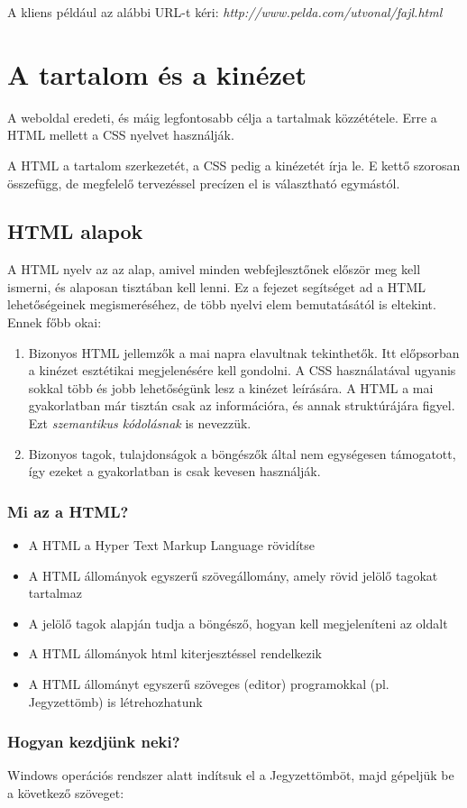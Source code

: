 \documentclass[12pt,twoside]{report}
\theoremstyle{definition}
\begin{document}
A kliens például az alábbi URL-t kéri: \emph{http://www.pelda.com/utvonal/fajl.html}
\chapter{A tartalom és a kinézet}
A weboldal eredeti, és máig legfontosabb célja a tartalmak közzététele. Erre a HTML mellett a CSS nyelvet használják.

A HTML a tartalom szerkezetét, a CSS pedig a kinézetét írja le. E kettő szorosan összefügg, de megfelelő tervezéssel precízen el is választható egymástól.
\section{HTML alapok}
A HTML nyelv az az alap, amivel minden webfejlesztőnek először meg kell ismerni, és alaposan tisztában kell lenni. Ez a fejezet segítséget ad a HTML lehetőségeinek megismeréséhez, de több nyelvi elem bemutatásától is eltekint. Ennek főbb okai:
\begin{enumerate}
	\item Bizonyos HTML jellemzők a mai napra elavultnak tekinthetők. Itt előpsorban a kinézet esztétikai megjelenésére kell gondolni. A CSS használatával ugyanis sokkal több és jobb lehetőségünk lesz a kinézet leírására. A HTML a mai gyakorlatban már tisztán csak az információra, és annak struktúrájára figyel. Ezt \emph{szemantikus kódolásnak} is nevezzük.
	\item Bizonyos tagok, tulajdonságok a böngészők által nem egységesen támogatott, így ezeket a gyakorlatban is csak kevesen használják.
\end{enumerate}
\subsection{Mi az a HTML?}
\begin{itemize}
	\item A HTML a Hyper Text Markup Language rövidítse
	\item A HTML állományok egyszerű szövegállomány, amely rövid jelölő tagokat tartalmaz
	\item A jelölő tagok alapján tudja a böngésző, hogyan kell megjeleníteni az oldalt
	\item A HTML állományok html kiterjesztéssel rendelkezik
	\item A HTML állományt egyszerű szöveges (editor) programokkal (pl. Jegyzettömb) is létrehozhatunk
\end{itemize}
\subsection{Hogyan kezdjünk neki?}
Windows operációs rendszer alatt indítsuk el a Jegyzettömböt, majd gépeljük be a következő szöveget:
\end{document}
